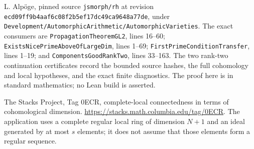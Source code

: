 L. Alp\"oge, pinned source \texttt{jsmorph/rh} at revision
\texttt{ecd09ff9b4aaf6c08f2b5ef17dc49ca9648a77de}, under
\texttt{Development/AutomorphicArithmetic/AutomorphicVarieties}.
The exact consumers are \texttt{PropagationTheoremGL2}, lines 16--60;
\texttt{ExistsNicePrimeAboveOfLargeDim}, lines 1--69;
\texttt{FirstPrimeConditionTransfer}, lines 1--19; and
\texttt{ComponentsGoodRankTwo}, lines 33--163.
The two rank-two continuation certificates record the bounded source
hashes, the full cohomology and local hypotheses, and the exact
finite diagnostics.  The proof here is in standard mathematics;
no Lean build is asserted.

The Stacks Project, Tag 0ECR, complete-local connectedness in terms
of cohomological dimension.
\url{https://stacks.math.columbia.edu/tag/0ECR}.
The application uses a complete regular local ring of dimension
$N+1$ and an ideal generated by at most $s$ elements; it does not
assume that those elements form a regular sequence.
